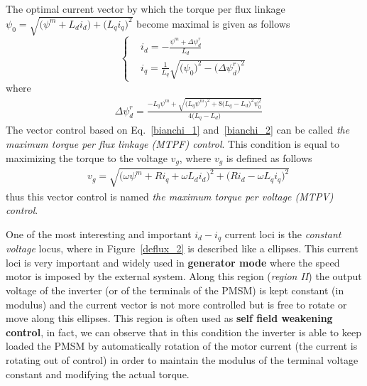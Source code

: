\documentclass[12pt,a4paper]{scrartcl}
\begin{document}
\begin{onehalfspace}
The optimal current vector by which the torque per flux linkage $\psi_0 = \sqrt{\Big(\psi^m+L_di_d \Big) + \Big(L_qi_q\Big)^2}$ become maximal is given as follows
\begin{equation}\label{bianchi_1}
	\left\lbrace \begin{aligned}
		&i_d=-\frac{\psi^m+\Delta \psi_d^r}{L_d} \\[6pt]
		&i_q=\frac{1}{L_q}\sqrt{\Big(\psi_0 \Big)^2-\Big(\Delta\psi_d^r \Big)^2}
	\end{aligned}\right. 
\end{equation}
where 
\begin{equation}\label{bianchi_2}
	\begin{aligned}
		&\Delta \psi_d^r = \frac{-L_q\psi^m+\sqrt{\Big(L_q\psi^m\Big)^2+8\Big(L_q-L_d\Big)^2\psi_0^2}}{4\big(L_q-L_d\big)}
	\end{aligned}
\end{equation}
The vector control based on Eq.~\eqref{bianchi_1} and~\ref{bianchi_2} can be called \textit{the maximum torque per flux linkage (MTPF) control}. This condition is equal to maximizing the torque to the voltage $v_g$, where  $v_g$ is defined as follows 
\begin{equation}\label{bianchi_3}
	\begin{aligned}
		&v_g = \sqrt{\Big(\omega\psi^m + Ri_q + \omega L_d i_d\Big)^2 + \Big(Ri_d - \omega L_q i_q\Big)^2}
	\end{aligned}
\end{equation}
thus this vector control is named \textit{the maximum torque per voltage (MTPV) control}. 

One of the most interesting and important $i_d-i_q$ current loci is the \textit{constant voltage} locus, where in Figure~\ref{deflux_2} is described like a ellipses. This current loci is very important and widely used in \textbf{generator mode} where the speed motor is imposed by the external system. Along this region (\textit{region II}) the output voltage of the inverter (or of the terminals of the PMSM) is kept constant (in modulus) and the current vector is not more controlled but is free to rotate or move along this ellipses. This region is often used as \textbf{self field weakening control}, in fact, we can observe that in this condition the inverter is able to keep loaded the PMSM by automatically rotation of the motor current (the current is rotating out of control) in order to maintain the modulus of the terminal voltage constant and modifying the actual torque.


\end{onehalfspace}
\end{document}
